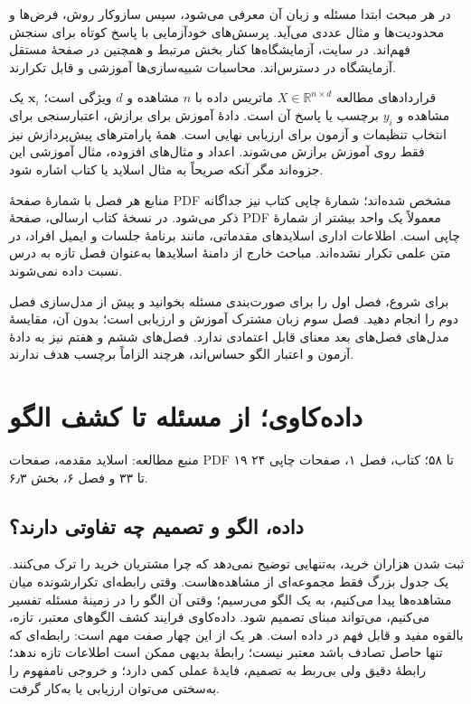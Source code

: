 \documentclass[12pt,a4paper,oneside]{report}
\newcounter{ex}[chapter]
\newcommand{\source}[1]{\par{\small\color{muted} منبع مطالعه: #1}\par}
\begin{document}
در هر مبحث ابتدا مسئله و زبان آن معرفی می‌شود، سپس سازوکار روش، فرض‌ها و محدودیت‌ها و مثال عددی می‌آید. پرسش‌های خودآزمایی با پاسخ کوتاه برای سنجش فهم‌اند. در سایت، آزمایشگاه‌ها کنار بخش مرتبط و همچنین در صفحهٔ مستقل آزمایشگاه در دسترس‌اند. محاسبات شبیه‌سازی‌ها آموزشی و قابل تکرارند.

\begin{important}{قراردادهای مطالعه}
$X\in\mathbb R^{n\times d}$ ماتریس داده با $n$ مشاهده و $d$ ویژگی است؛ $\mathbf x_i$ یک مشاهده و $y_i$ برچسب یا پاسخ آن است. دادهٔ آموزش برای برازش، اعتبارسنجی برای انتخاب تنظیمات و آزمون برای ارزیابی نهایی است. همهٔ پارامترهای پیش‌پردازش نیز فقط روی آموزش برازش می‌شوند. اعداد و مثال‌های افزوده، مثال آموزشی این جزوه‌اند مگر آنکه صریحاً به مثال اسلاید یا کتاب اشاره شود.
\end{important}

منابع هر فصل با شمارهٔ صفحهٔ PDF مشخص شده‌اند؛ شمارهٔ چاپی کتاب نیز جداگانه ذکر می‌شود. در نسخهٔ کتاب ارسالی، صفحهٔ PDF معمولاً یک واحد بیشتر از شمارهٔ چاپی است. اطلاعات اداری اسلایدهای مقدماتی، مانند برنامهٔ جلسات و ایمیل افراد، در متن علمی تکرار نشده‌اند. مباحث خارج از دامنهٔ اسلایدها به‌عنوان فصل تازه به درس نسبت داده نمی‌شوند.

برای شروع، فصل اول را برای صورت‌بندی مسئله بخوانید و پیش از مدل‌سازی فصل دوم را انجام دهید. فصل سوم زبان مشترک آموزش و ارزیابی است؛ بدون آن، مقایسهٔ مدل‌های فصل‌های بعد معنای قابل اعتمادی ندارد. فصل‌های ششم و هفتم نیز به دادهٔ آزمون و اعتبار الگو حساس‌اند، هرچند الزاماً برچسب هدف ندارند.

\tableofcontents
\clearpage{}
\chapter{داده‌کاوی؛ از مسئله تا کشف الگو}
\source{اسلاید مقدمه، صفحات PDF ۱۹ تا ۵۸؛ کتاب، فصل ۱، صفحات چاپی ۲۴ تا ۳۳ و فصل ۶، بخش ۶٫۳.}

\section{داده، الگو و تصمیم چه تفاوتی دارند؟}
ثبت شدن هزاران خرید، به‌تنهایی توضیح نمی‌دهد که چرا مشتریان خرید را ترک می‌کنند. یک جدول بزرگ فقط مجموعه‌ای از مشاهده‌هاست. وقتی رابطه‌ای تکرارشونده میان مشاهده‌ها پیدا می‌کنیم، به یک الگو می‌رسیم؛ وقتی آن الگو را در زمینهٔ مسئله تفسیر می‌کنیم، می‌تواند مبنای تصمیم شود. داده‌کاوی  فرایند کشف الگوهای معتبر، تازه، بالقوه مفید و قابل فهم در داده است. هر یک از این چهار صفت مهم است: رابطه‌ای که تنها حاصل تصادف باشد معتبر نیست؛ رابطهٔ بدیهی ممکن است اطلاعات تازه ندهد؛ رابطهٔ دقیق ولی بی‌ربط به تصمیم، فایدهٔ عملی کمی دارد؛ و خروجی نامفهوم را به‌سختی می‌توان ارزیابی یا به‌کار گرفت.
\end{document}
